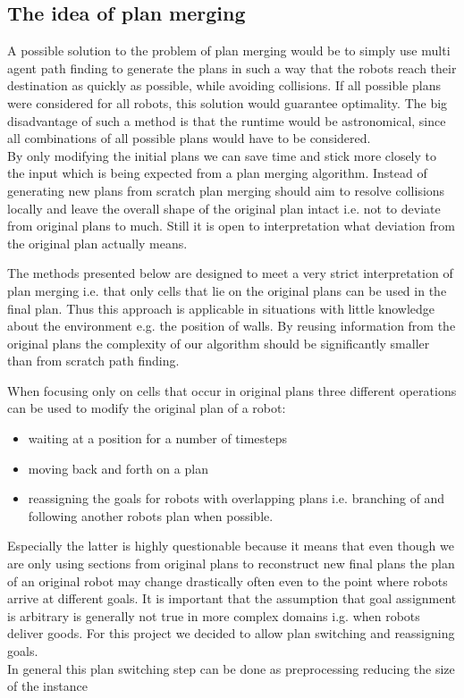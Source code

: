 \documentclass{llncs}
\begin{document}
\subsection{The idea of plan merging}
A possible solution to the problem of plan merging would be to simply use multi agent path finding to generate the plans in such a way that the robots reach their destination as quickly as possible, while avoiding collisions. If all possible plans were considered for all robots, this solution would guarantee optimality. The big disadvantage of such a method is that the runtime would be astronomical, since all combinations of all possible plans would have to be considered. \\
By only modifying the initial plans we can save time and stick more closely to the input which is being expected from a plan merging algorithm.
Instead of generating new plans from scratch plan merging should aim to resolve collisions locally and leave the overall shape of the original plan intact i.e. not to deviate from original plans to much.
Still it is open to interpretation what deviation from the original plan actually means. 

The methods presented below are designed to meet a very strict interpretation of plan merging i.e. that only cells that lie on the original plans can be used in the final plan. Thus this approach is applicable in situations with little knowledge about the environment e.g. the position of walls.
By reusing information from the original plans the complexity of our algorithm should be significantly smaller than from scratch path finding. 
\newpage

When focusing only on cells that occur in original plans three different operations can be used to modify the original plan of a robot: 
\begin{itemize}
\item waiting at a position for a number of timesteps
\item moving back and forth on a plan
\item reassigning the goals for robots with overlapping plans i.e. branching of and following another robots plan when possible. 
\end{itemize}
Especially the latter is highly questionable because it means that even though we are only using sections from original plans to reconstruct new final plans the plan of an original robot may change drastically often even to the point where robots arrive at different goals. It is important that the assumption that goal assignment is arbitrary is generally not true in more complex domains i.g. when robots deliver goods. For this project we decided to allow plan switching and reassigning goals.\\
In general this plan switching step can be done as preprocessing reducing the size of the instance 
\end{document}
